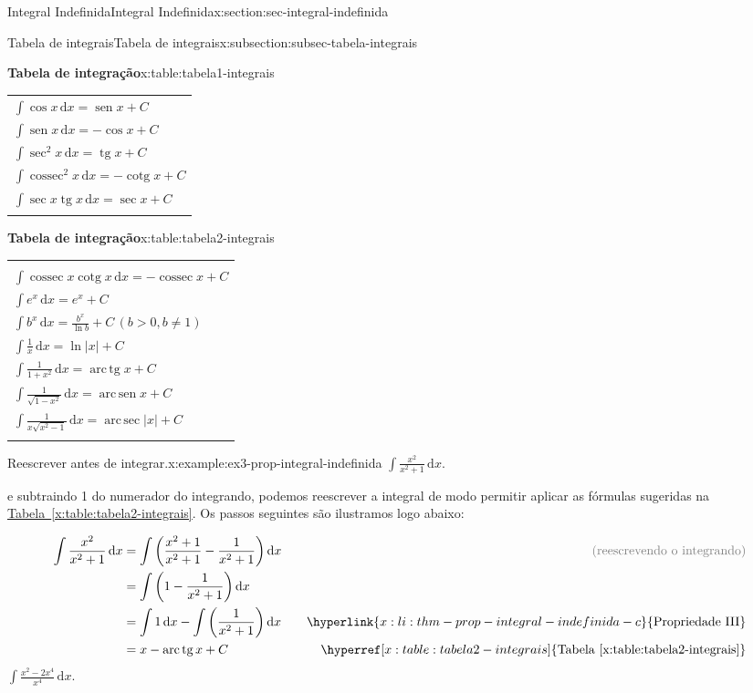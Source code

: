 \documentclass[oneside,10pt,]{article}
\newcommand{\tabularfont}{\relax}
\newcommand{\xreffont}{\relax}
\numberwithin{equation}{section}
\newcommand{\hrulethin}  {\noalign{\hrule height 0.04em}}
\newcommand{\hrulemedium}{\noalign{\hrule height 0.07em}}
\newcommand{\hrulethick} {\noalign{\hrule height 0.11em}}
\newcommand{\dd}{\mathrm{d}}
\newcommand{\integral}[2]{\displaystyle\int {#1}\,\dd {#2}}
\DeclareMathOperator{\arcsec}{arc \,sec}
\DeclareMathOperator{\sin}{sen}
\DeclareMathOperator{\arcsin}{arc \,sen}
\DeclareMathOperator{\csc}{cossec}
\DeclareMathOperator{\tan}{tg}
\DeclareMathOperator{\arctan}{arc\,tg}
\DeclareMathOperator{\cot}{cotg}
\newcommand{\amp}{&}
\begin{document}
\begin{sectionptx}{Integral Indefinida}{}{Integral Indefinida}{}{}{x:section:sec-integral-indefinida}
\begin{subsectionptx}{Tabela de integrais}{}{Tabela de integrais}{}{}{x:subsection:subsec-tabela-integrais}
\begin{tableptx}{\textbf{Tabela de integração}}{x:table:tabela1-integrais}{}
{\begin{tabular}{l}
\(\integral{\cos{x}}{x}=\sin{x} + C\)\tabularnewline[0pt]
\(\integral{\sin{x}}{x}=-\cos{x} + C\)\tabularnewline[0pt]
\(\integral{\sec^2{x}}{x}=\tan{x} + C\)\tabularnewline[0pt]
\(\integral{\csc^2{x}}{x}=-\cot{x} + C\)\tabularnewline[0pt]
\(\integral{\sec{x}\tan{x}}{x}=\sec{x} + C\)\tabularnewline\hrulemedium
\end{tabular}
}%
\end{tableptx}%
\begin{tableptx}{\textbf{Tabela de integração}}{x:table:tabela2-integrais}{}%
\centering%
{\tabularfont%
\begin{tabular}{l}\hrulethick
\multicolumn{1}{c}{Fórmula}\tabularnewline\hrulethin
\(\integral{\csc{x}\cot{x}}{x}=-\csc{x} + C\)\tabularnewline[0pt]
\(\integral{e^x}{x} = e^x + C\)\tabularnewline[0pt]
\(\integral{b^x}{x}= \frac{b^x}{\ln{b}} + C\, (b>0, b\neq 1)\)\tabularnewline[0pt]
\(\integral{\frac{1}{x}}{x}=\ln{|x|} + C\)\tabularnewline[0pt]
\(\integral{\frac{1}{1+x^2}}{x}=\arctan{x} + C\)\tabularnewline[0pt]
\(\integral{\frac{1}{\sqrt{1-x^2}}}{x}=\arcsin{x} + C\)\tabularnewline[0pt]
\(\integral{\frac{1}{x\sqrt{x^2-1}}}{x}=\arcsec{|x|} + C\)\tabularnewline\hrulemedium
\end{tabular}
}%
\end{tableptx}%
\begin{example}{Reescrever antes de integrar.}{x:example:ex3-prop-integral-indefinida}%
\(\integral{\frac{x^2}{x^2+1}}{x}\).%
\par\smallskip%
\noindentSomando e subtraindo 1 do numerador do integrando, podemos reescrever a integral de modo permitir aplicar as fórmulas sugeridas na \hyperref[x:table:tabela2-integrais]{Tabela~{\xreffont\ref{x:table:tabela2-integrais}}}. Os passos seguintes são ilustramos logo abaixo:%
\par
%
\begin{align*}
\integral{\frac{x^2}{x^2+1}}{x} \amp = \integral{\left(\frac{x^2+1}{x^2+1}-\frac{1}{x^2+1}\right)}{x} \amp \color{gray}{\text{(reescrevendo o integrando)}}\\
\amp =\integral{\left(1-\frac{1}{x^2+1}\right)}{x} \\
\amp = \integral{1}{x} - \integral{\left(\frac{1}{x^2+1}\right)}{x} \quad \amp \hyperlink{x:li:thm-prop-integral-indefinida-c}{\text{Propriedade III}}\\
\amp = x - \arctan{x} + C \quad  \quad \amp \hyperref[x:table:tabela2-integrais]{\text{Tabela {\xreffont\ref{x:table:tabela2-integrais}}}}
\end{align*}
%
 \(\integral{\frac{x^2- 2x^4}{x^4}}{x}\).%

\end{example}
\end{subsectionptx}
\end{sectionptx}
\end{document}
